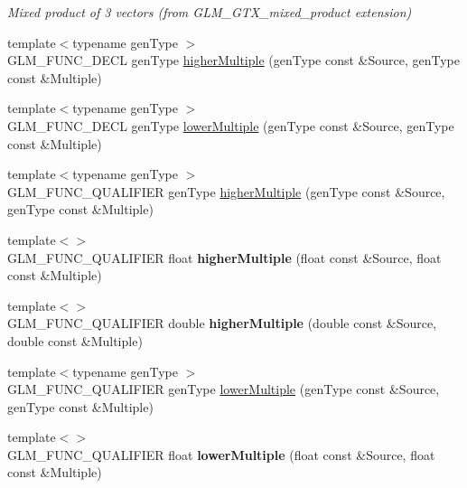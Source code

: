 \begin{DoxyCompactItemize}
\begin{DoxyCompactList}\small\item\em Mixed product of 3 vectors (from G\+L\+M\+\_\+\+G\+T\+X\+\_\+mixed\+\_\+product extension) \end{DoxyCompactList}\item 
{\footnotesize template$<$typename gen\+Type $>$ }\\G\+L\+M\+\_\+\+F\+U\+N\+C\+\_\+\+D\+E\+CL gen\+Type \hyperlink{group__gtx__multiple_gaa2bb85aaacfdb9366b8365f8d5c7e25d}{higher\+Multiple} (gen\+Type const \&Source, gen\+Type const \&Multiple)
\item 
{\footnotesize template$<$typename gen\+Type $>$ }\\G\+L\+M\+\_\+\+F\+U\+N\+C\+\_\+\+D\+E\+CL gen\+Type \hyperlink{group__gtx__multiple_ga11b955f3cb3589d561c8991118771ea6}{lower\+Multiple} (gen\+Type const \&Source, gen\+Type const \&Multiple)
\item 
{\footnotesize template$<$typename gen\+Type $>$ }\\G\+L\+M\+\_\+\+F\+U\+N\+C\+\_\+\+Q\+U\+A\+L\+I\+F\+I\+ER gen\+Type \hyperlink{group__gtx__multiple_gaa2bb85aaacfdb9366b8365f8d5c7e25d}{higher\+Multiple} (gen\+Type const \&Source, gen\+Type const \&Multiple)
\item 
{\footnotesize template$<$$>$ }\\G\+L\+M\+\_\+\+F\+U\+N\+C\+\_\+\+Q\+U\+A\+L\+I\+F\+I\+ER float {\bfseries higher\+Multiple} (float const \&Source, float const \&Multiple)\hypertarget{namespaceglm_a4afea9468d6dcf0048e2c06db79bc8c7}{}\label{namespaceglm_a4afea9468d6dcf0048e2c06db79bc8c7}

\item 
{\footnotesize template$<$$>$ }\\G\+L\+M\+\_\+\+F\+U\+N\+C\+\_\+\+Q\+U\+A\+L\+I\+F\+I\+ER double {\bfseries higher\+Multiple} (double const \&Source, double const \&Multiple)\hypertarget{namespaceglm_a2cd56fa0402782c78e225f1a551bbdc1}{}\label{namespaceglm_a2cd56fa0402782c78e225f1a551bbdc1}

\item 
{\footnotesize template$<$typename gen\+Type $>$ }\\G\+L\+M\+\_\+\+F\+U\+N\+C\+\_\+\+Q\+U\+A\+L\+I\+F\+I\+ER gen\+Type \hyperlink{group__gtx__multiple_ga11b955f3cb3589d561c8991118771ea6}{lower\+Multiple} (gen\+Type const \&Source, gen\+Type const \&Multiple)
\item 
{\footnotesize template$<$$>$ }\\G\+L\+M\+\_\+\+F\+U\+N\+C\+\_\+\+Q\+U\+A\+L\+I\+F\+I\+ER float {\bfseries lower\+Multiple} (float const \&Source, float const \&Multiple)\hypertarget{namespaceglm_ac3ba0c930ff55364862b250e88f742df}{}\label{namespaceglm_ac3ba0c930ff55364862b250e88f742df}


\end{DoxyCompactItemize}
